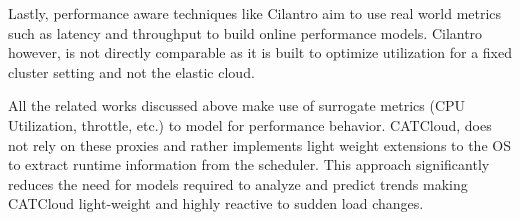 Lastly, performance aware techniques like Cilantro \cite{bhardwaj_cilantro_2023} aim to use real world metrics such as latency and throughput to build online performance models. Cilantro however, is not directly comparable as it is built to optimize utilization for a fixed cluster setting and not the elastic cloud.

All the related works discussed above make use of surrogate metrics (CPU Utilization, throttle, etc.) to model for performance behavior. CATCloud, does not rely on these proxies and rather implements light weight extensions to the OS to extract runtime information from the scheduler. This approach significantly reduces the need for models required to analyze and predict trends making CATCloud light-weight and highly reactive to sudden load changes.
